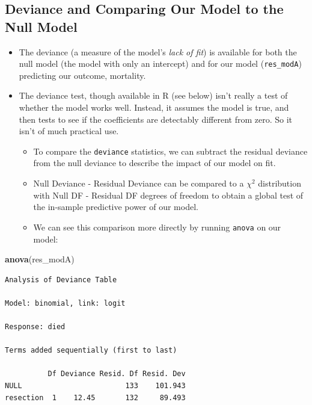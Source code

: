 \documentclass[]{book}
\newenvironment{Shaded}{\begin{snugshade}}{\end{snugshade}}
\newcommand{\KeywordTok}[1]{\textcolor[rgb]{0.13,0.29,0.53}{\textbf{#1}}}
\newcommand{\NormalTok}[1]{#1}
\providecommand{\tightlist}{%
  \setlength{\itemsep}{0pt}\setlength{\parskip}{0pt}}
\theoremstyle{definition}
\theoremstyle{definition}
\theoremstyle{definition}
\theoremstyle{remark}
\begin{document}
\subsection{Deviance and Comparing Our Model to the Null
Model}\label{deviance-and-comparing-our-model-to-the-null-model}

\begin{itemize}
\tightlist
\item
  The deviance (a measure of the model's \emph{lack of fit}) is
  available for both the null model (the model with only an intercept)
  and for our model (\texttt{res\_modA}) predicting our outcome,
  mortality.
\item
  The deviance test, though available in R (see below) isn't really a
  test of whether the model works well. Instead, it assumes the model is
  true, and then tests to see if the coefficients are detectably
  different from zero. So it isn't of much practical use.

  \begin{itemize}
  \tightlist
  \item
    To compare the \texttt{deviance} statistics, we can subtract the
    residual deviance from the null deviance to describe the impact of
    our model on fit.
  \item
    Null Deviance - Residual Deviance can be compared to a \(\chi^2\)
    distribution with Null DF - Residual DF degrees of freedom to obtain
    a global test of the in-sample predictive power of our model.
  \item
    We can see this comparison more directly by running \texttt{anova}
    on our model:
  \end{itemize}
\end{itemize}

\begin{Shaded}
\begin{Highlighting}[]
\KeywordTok{anova}\NormalTok{(res_modA)}
\end{Highlighting}
\end{Shaded}

\begin{verbatim}
Analysis of Deviance Table

Model: binomial, link: logit

Response: died

Terms added sequentially (first to last)

          Df Deviance Resid. Df Resid. Dev
NULL                        133    101.943
resection  1    12.45       132     89.493
\end{verbatim}
\end{document}
